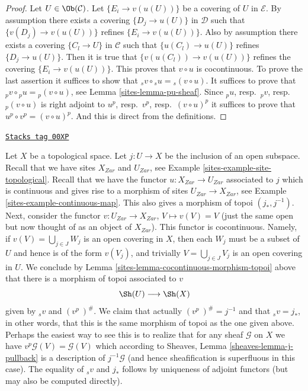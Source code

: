 \begin{proof}

Let $U \in \Ob(\mathcal{C})$.
Let $\{E_i \to v(u(U))\}$ be a covering of $U$ in $\mathcal{E}$.
By assumption there exists a covering $\{D_j \to u(U)\}$ in $\mathcal{D}$
such that $\{v(D_j) \to v(u(U))\}$ refines $\{E_i \to v(u(U))\}$. Also
by assumption there exists a covering $\{C_l \to U\}$ in $\mathcal{C}$
such that $\{u(C_l) \to u(U)\}$ refines $\{D_j \to u(U)\}$. Then it is
true that $\{v(u(C_l)) \to v(u(U))\}$ refines the covering
$\{E_i \to v(u(U))\}$. This proves that $v \circ u$ is cocontinuous.
To prove the last assertion it suffices to show that
${}_sv \circ {}_su = {}_s(v \circ u)$. It suffices to prove that
${}_pv \circ {}_pu = {}_p(v \circ u)$, see Lemma \ref{sites-lemma-pu-sheaf}.
Since ${}_pu$, resp.\ ${}_pv$, resp.\ ${}_p(v \circ u)$ is right adjoint to
$u^p$, resp.\ $v^p$, resp.\ $(v \circ u)^p$ it suffices to prove that
$u^p \circ v^p = (v \circ u)^p$. And this is direct from the definitions.
\end{proof}

\begin{example}
\label{sites-example-open-immersion-cocontinuous}
\href{https://stacks.math.columbia.edu/tag/00XP}{\texttt{Stacks tag 00XP}}

Let $X$ be a topological space.
Let $j : U  \to X$ be the inclusion of an open subspace.
Recall that we have sites $X_{Zar}$ and $U_{Zar}$,
see Example \ref{sites-example-site-topological}.
Recall that we have the functor $u : X_{Zar} \to U_{Zar}$
associated to $j$ which is continuous and gives rise
to a morphism of sites $U_{Zar} \to X_{Zar}$,
see Example \ref{sites-example-continuous-map}.
This also gives a morphism of topoi $(j_*, j^{-1})$.
Next, consider the functor
$v : U_{Zar} \to X_{Zar}$, $V \mapsto v(V) = V$
(just the same open but now thought of as an object of $X_{Zar}$).
This functor is cocontinuous. Namely, if $v(V) = \bigcup_{j \in J} W_j$
is an open covering in $X$, then each $W_j$ must be a subset of
$U$ and hence is of the form $v(V_j)$,
and trivially $V = \bigcup_{j \in J} V_j$ is an open covering in $U$.
We conclude by Lemma \ref{sites-lemma-cocontinuous-morphism-topoi} above
that there is a morphism of topoi associated to $v$
$$
\Sh(U) \longrightarrow \Sh(X)
$$
given by ${}_sv$ and $(v^p\ )^\#$. We claim that
actually $(v^p\ )^\# = j^{-1}$ and that ${}_sv = j_*$,
in other words, that this is the same morphism of topoi
as the one given above. Perhaps the easiest way to see
this is to realize that for any sheaf
$\mathcal{G}$ on $X$ we have
$v^p\mathcal{G}(V) = \mathcal{G}(V)$ which according to
Sheaves, Lemma \ref{sheaves-lemma-j-pullback} is a description
of $j^{-1}\mathcal{G}$ (and hence sheafification is superfluous
in this case). The equality of ${}_sv$ and $j_*$ follows by
uniqueness of adjoint functors (but may also be computed directly).
\end{example}

